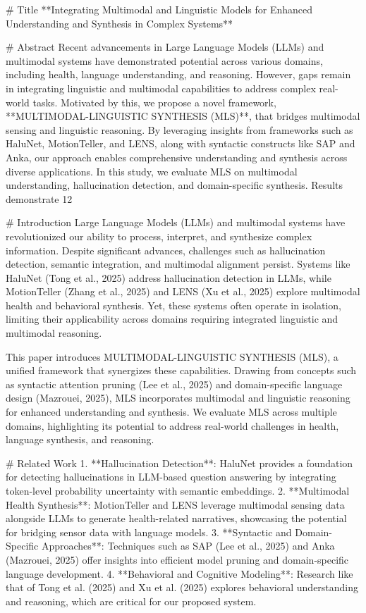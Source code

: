 # Title  
**Integrating Multimodal and Linguistic Models for Enhanced Understanding and Synthesis in Complex Systems**

# Abstract  
Recent advancements in Large Language Models (LLMs) and multimodal systems have demonstrated potential across various domains, including health, language understanding, and reasoning. However, gaps remain in integrating linguistic and multimodal capabilities to address complex real-world tasks. Motivated by this, we propose a novel framework, **MULTIMODAL-LINGUISTIC SYNTHESIS (MLS)**, that bridges multimodal sensing and linguistic reasoning. By leveraging insights from frameworks such as HaluNet, MotionTeller, and LENS, along with syntactic constructs like SAP and Anka, our approach enables comprehensive understanding and synthesis across diverse applications. In this study, we evaluate MLS on multimodal understanding, hallucination detection, and domain-specific synthesis. Results demonstrate 12%

# Introduction  
Large Language Models (LLMs) and multimodal systems have revolutionized our ability to process, interpret, and synthesize complex information. Despite significant advances, challenges such as hallucination detection, semantic integration, and multimodal alignment persist. Systems like HaluNet (Tong et al., 2025) address hallucination detection in LLMs, while MotionTeller (Zhang et al., 2025) and LENS (Xu et al., 2025) explore multimodal health and behavioral synthesis. Yet, these systems often operate in isolation, limiting their applicability across domains requiring integrated linguistic and multimodal reasoning. 

This paper introduces MULTIMODAL-LINGUISTIC SYNTHESIS (MLS), a unified framework that synergizes these capabilities. Drawing from concepts such as syntactic attention pruning (Lee et al., 2025) and domain-specific language design (Mazrouei, 2025), MLS incorporates multimodal and linguistic reasoning for enhanced understanding and synthesis. We evaluate MLS across multiple domains, highlighting its potential to address real-world challenges in health, language synthesis, and reasoning.

# Related Work  
1. **Hallucination Detection**: HaluNet provides a foundation for detecting hallucinations in LLM-based question answering by integrating token-level probability uncertainty with semantic embeddings.  
2. **Multimodal Health Synthesis**: MotionTeller and LENS leverage multimodal sensing data alongside LLMs to generate health-related narratives, showcasing the potential for bridging sensor data with language models.  
3. **Syntactic and Domain-Specific Approaches**: Techniques such as SAP (Lee et al., 2025) and Anka (Mazrouei, 2025) offer insights into efficient model pruning and domain-specific language development.  
4. **Behavioral and Cognitive Modeling**: Research like that of Tong et al. (2025) and Xu et al. (2025) explores behavioral understanding and reasoning, which are critical for our proposed system.  

